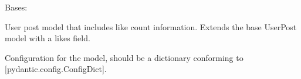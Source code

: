 \documentclass[letterpaper,10pt,openany,oneside,english]{sphinxmanual}
\begin{document}
\begin{savenotes}\begin{fulllineitems}

\pysigstartsignatures
{}
\pysigstopsignatures
\sphinxAtStartPar
Bases: 

\sphinxAtStartPar
User post model that includes like count information.
Extends the base UserPost model with a likes field.


\begin{savenotes}\begin{fulllineitems}

\pysigstartsignatures
{}
\pysigstopsignatures
\end{fulllineitems}\end{savenotes}



\begin{savenotes}\begin{fulllineitems}

\pysigstartsignatures
{}
\pysigstopsignatures
\sphinxAtStartPar
Configuration for the model, should be a dictionary conforming to {[}\sphinxtitleref{ConfigDict}{]}{[}pydantic.config.ConfigDict{]}.

\end{fulllineitems}\end{savenotes}


\end{fulllineitems}\end{savenotes}
\end{document}
